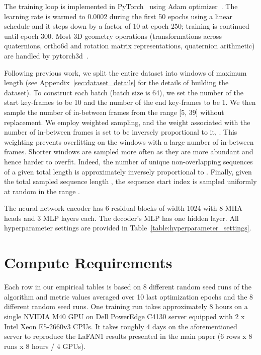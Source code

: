 \documentclass[letterpaper]{article} \usepackage[]{aaai23}  \usepackage{times}  \usepackage{helvet}  \usepackage{courier}  \usepackage[hyphens]{url}  \usepackage{graphicx} \urlstyle{rm} \def\UrlFont{\rm}  \usepackage{natbib}  \usepackage{caption} \frenchspacing  \setlength{\pdfpagewidth}{8.5in} \setlength{\pdfpageheight}{11in}
\begin{document}
The training loop is implemented in PyTorch~\cite{paszke2019pytorch} using Adam optimizer~\cite{kingma2015adam}. The learning rate is warmed to 0.0002 during the first 50 epochs using a linear schedule and it steps down by a factor of 10 at epoch 250; training is continued until epoch 300. Most 3D geometry operations (transformations across quaternions, ortho6d and rotation matrix representations, quaternion arithmetic) are handled by pytorch3d~\citep{ravi2020pytorch3d}. 

Following previous work, we split the entire dataset into windows of maximum length  (see Appendix~\ref{sec:dataset_details} for the details of building the dataset). To construct each batch (batch size is 64), we set the number of the start key-frames to be 10 and the number of the end key-frames to be 1. We then sample the number of in-between frames from the range [5, 39] without replacement. We employ weighted sampling, and the weight associated with the number of in-between frames  is set to be inversely proportional to it, . This weighting prevents overfitting on the windows with a large number of in-between frames. Shorter windows are sampled more often as they are more abundant and hence harder to overfit. Indeed, the number of unique non-overlapping sequences of a given total length  is approximately inversely proportional to . Finally, given the total sampled sequence length , the sequence start index is sampled uniformly at random in the range .

The neural network encoder has 6 residual blocks  of width 1024 with 8 MHA heads and 3 MLP layers each. The decoder's MLP has one hidden layer. All hyperparameter settings are provided in Table~\ref{table:hyperparameter_settings}. 

\section{Compute Requirements}\label{sec:compute}

Each row in our empirical tables is based on 8 different random seed runs of the algorithm and metric values averaged over 10 last optimization epochs and the 8 different random seed runs. One training run takes approximately 8 hours on a single NVIDIA M40 GPU on Dell PowerEdge C4130 server equipped  with 2 x Intel Xeon E5-2660v3 CPUs. It takes roughly 4 days on the aforementioned server to reproduce the LaFAN1 results presented in the main paper (6 rows x 8 runs x 8 hours / 4 GPUs).
\end{document}
